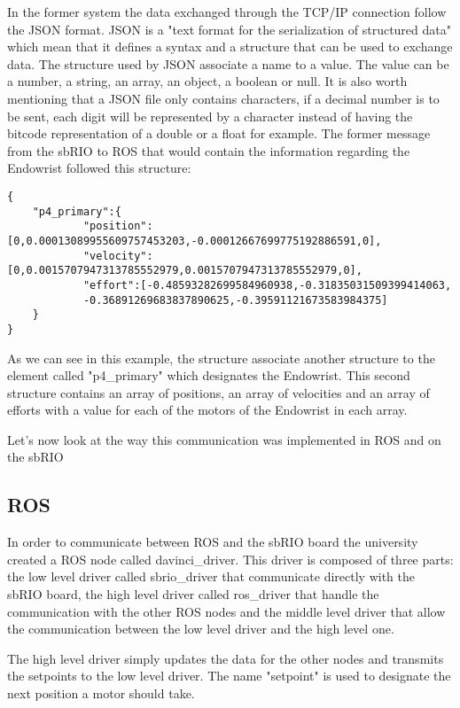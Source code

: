 In the former system the data exchanged through the TCP/IP connection follow the \gls{JSON} format. \gls{JSON} is a "text format for the serialization of structured data"\cite{JSON_IETF} which mean that it defines a syntax and a structure that can be used to exchange data. The structure used by \gls{JSON} associate a name to a value. The value can be a number, a string, an array, an object, a boolean or null. It is also worth mentioning that a \gls{JSON} file only contains characters, if a decimal number is to be sent, each digit will be represented by a character instead of having the bitcode representation of a double or a float for example. The former message from the sbRIO to ROS that would contain the information regarding the Endowrist followed this structure:

\begin{lstlisting}
{
	"p4_primary":{
			"position":[0,0.00013089955609757453203,-0.00012667699775192886591,0],
			"velocity":[0,0.0015707947313785552979,0.0015707947313785552979,0],
			"effort":[-0.48593282699584960938,-0.31835031509399414063,
			-0.36891269683837890625,-0.39591121673583984375]
	}
}
\end{lstlisting} 

As we can see in this example, the structure associate another structure to the element called "p4\_primary" which designates the Endowrist. This second structure contains an array of positions, an array of velocities and an array of efforts with a value for each of the motors of the Endowrist in each array.

Let's now look at the way this communication was implemented in ROS and on the sbRIO

\subsection{ROS}\label{sec:ros}

In order to communicate between ROS and the sbRIO board the university created a ROS node called davinci\_driver. This driver is composed of three parts: the low level driver called sbrio\_driver that communicate directly with the sbRIO board, the high level driver called ros\_driver that handle the communication with the other ROS nodes and the middle level driver that allow the communication between the low level driver and the high level one.


The high level driver simply updates the data for the other nodes and transmits the setpoints to the low level driver. The name "setpoint" is used to designate the next position a motor should take.

